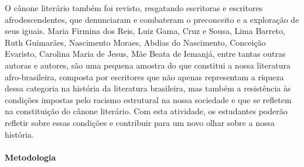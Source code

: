 \documentclass[12pt]{extarticle}
\begin{document}
O cânone literário também foi revisto, resgatando escritoras e
escritores afrodescendentes, que denunciaram e combateram o preconceito
e a exploração de seus iguais. Maria Firmina dos Reis, Luiz Gama, Cruz e
Sousa, Lima Barreto, Ruth Guimarães, Nascimento Moraes, Abdias do
Nascimento, Conceição Evaristo, Carolina Maria de Jesus, Mãe Beata de
Iemanjá, entre tantas outras autoras e autores, são uma pequena amostra
do que constitui a nossa literatura afro-brasileira, composta por
escritores que não apenas representam a riqueza dessa categoria na
história da literatura brasileira, mas também a resistência às condições
impostas pelo racismo estrutural na nossa sociedade e que se refletem na
constituição do cânone literário. Com esta atividade, os estudantes
poderão refletir sobre essas condições e contribuir para um novo olhar
sobre a nossa história.

\paragraph{Metodologia}
\end{document}
